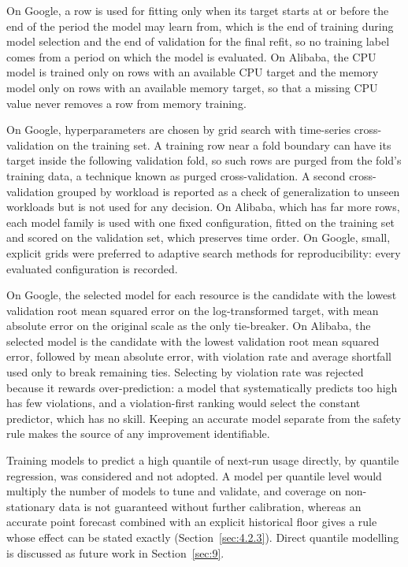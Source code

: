 On Google, a row is used for fitting only when its target starts at or before the end of the period the model may learn from, which is the end of training during model selection and the end of validation for the final refit, so no training label comes from a period on which the model is evaluated. On Alibaba, the CPU model is trained only on rows with an available CPU target and the memory model only on rows with an available memory target, so that a missing CPU value never removes a row from memory training.

On Google, hyperparameters are chosen by grid search with time-series cross-validation on the training set. A training row near a fold boundary can have its target inside the following validation fold, so such rows are purged from the fold's training data, a technique known as purged cross-validation. A second cross-validation grouped by workload is reported as a check of generalization to unseen workloads but is not used for any decision. On Alibaba, which has far more rows, each model family is used with one fixed configuration, fitted on the training set and scored on the validation set, which preserves time order. On Google, small, explicit grids were preferred to adaptive search methods for reproducibility: every evaluated configuration is recorded.

On Google, the selected model for each resource is the candidate with the lowest validation root mean squared error on the log-transformed target, with mean absolute error on the original scale as the only tie-breaker. On Alibaba, the selected model is the candidate with the lowest validation root mean squared error, followed by mean absolute error, with violation rate and average shortfall used only to break remaining ties. Selecting by violation rate was rejected because it rewards over-prediction: a model that systematically predicts too high has few violations, and a violation-first ranking would select the constant predictor, which has no skill. Keeping an accurate model separate from the safety rule makes the source of any improvement identifiable.

Training models to predict a high quantile of next-run usage directly, by quantile regression, was considered and not adopted. A model per quantile level would multiply the number of models to tune and validate, and coverage on non-stationary data is not guaranteed without further calibration, whereas an accurate point forecast combined with an explicit historical floor gives a rule whose effect can be stated exactly (Section~\ref{sec:4.2.3}). Direct quantile modelling is discussed as future work in Section~\ref{sec:9}.

